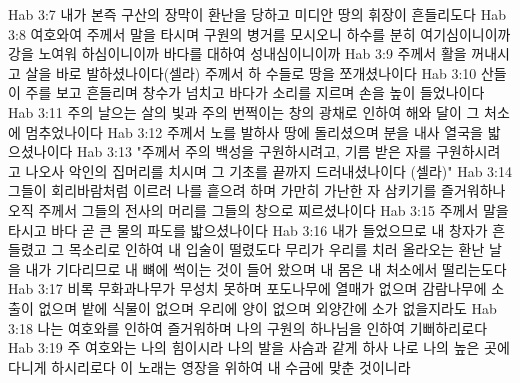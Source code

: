 Hab 3:7  내가 본즉 구산의 장막이 환난을 당하고 미디안 땅의 휘장이 흔들리도다
Hab 3:8  여호와여 주께서 말을 타시며 구원의 병거를 모시오니 하수를 분히 여기심이니이까 강을 노여워 하심이니이까 바다를 대하여 성내심이니이까
Hab 3:9  주께서 활을 꺼내시고 살을 바로 발하셨나이다(셀라) 주께서 하 수들로 땅을 쪼개셨나이다
Hab 3:10  산들이 주를 보고 흔들리며 창수가 넘치고 바다가 소리를 지르며 손을 높이 들었나이다
Hab 3:11  주의 날으는 살의 빛과 주의 번쩍이는 창의 광채로 인하여 해와 달이 그 처소에 멈추었나이다
Hab 3:12  주께서 노를 발하사 땅에 돌리셨으며 분을 내사 열국을 밟으셨나이다
Hab 3:13  "주께서 주의 백성을 구원하시려고, 기름 받은 자를 구원하시려고 나오사 악인의 집머리를 치시며 그 기초를 끝까지 드러내셨나이다 (셀라)"
Hab 3:14  그들이 회리바람처럼 이르러 나를 흩으려 하며 가만히 가난한 자 삼키기를 즐거워하나 오직 주께서 그들의 전사의 머리를 그들의 창으로 찌르셨나이다
Hab 3:15  주께서 말을 타시고 바다 곧 큰 물의 파도를 밟으셨나이다
Hab 3:16  내가 들었으므로 내 창자가 흔들렸고 그 목소리로 인하여 내 입술이 떨렸도다 무리가 우리를 치러 올라오는 환난 날을 내가 기다리므로 내 뼈에 썩이는 것이 들어 왔으며 내 몸은 내 처소에서 떨리는도다
Hab 3:17  비록 무화과나무가 무성치 못하며 포도나무에 열매가 없으며 감람나무에 소출이 없으며 밭에 식물이 없으며 우리에 양이 없으며 외양간에 소가 없을지라도
Hab 3:18  나는 여호와를 인하여 즐거워하며 나의 구원의 하나님을 인하여 기뻐하리로다
Hab 3:19  주 여호와는 나의 힘이시라 나의 발을 사슴과 같게 하사 나로 나의 높은 곳에 다니게 하시리로다 이 노래는 영장을 위하여 내 수금에 맞춘 것이니라


